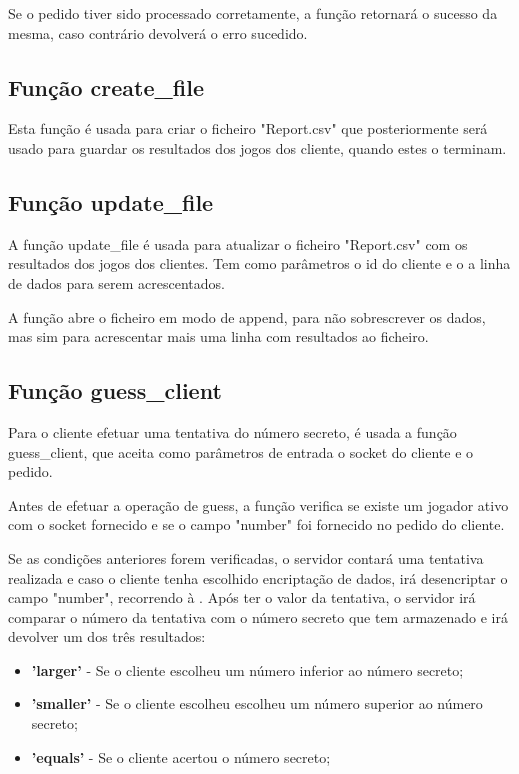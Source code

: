 \documentclass{report}
\begin{document}
Se o pedido tiver sido processado corretamente, a função retornará o sucesso da mesma, caso contrário devolverá o erro sucedido.

\subsection{Função create\_file}
\label{ssec:func_create_file}

Esta função é usada para criar o ficheiro "Report.csv" que posteriormente será usado para guardar os resultados dos jogos dos cliente, quando estes o terminam.

\subsection{Função update\_file}
\label{ssec:func_update_file}

A função update\_file é usada para atualizar o ficheiro "Report.csv" com os resultados dos jogos dos clientes. Tem como parâmetros o id do cliente e o a linha de dados para serem acrescentados.

A função abre o ficheiro em modo de append, para não sobrescrever os dados, mas sim para acrescentar mais uma linha com resultados ao ficheiro.

\subsection{Função guess\_client}
\label{ssec:func_guess_client}

Para o cliente efetuar uma tentativa do número secreto, é usada a função guess\_client, que aceita como parâmetros de entrada o socket do cliente e o pedido.

Antes de efetuar a operação de guess, a função verifica se existe um jogador ativo com o socket fornecido e se o campo "number" foi fornecido no pedido do cliente.

Se as condições anteriores forem verificadas, o servidor contará uma tentativa realizada e caso o cliente tenha escolhido encriptação de dados, irá desencriptar o campo "number", recorrendo à . Após ter o valor da tentativa, o servidor irá comparar o número da tentativa com o número secreto que tem armazenado e irá devolver um dos três resultados:
\begin{itemize}
\item \textbf{'larger'} - Se o cliente escolheu um número inferior ao número secreto;
\item \textbf{'smaller'} - Se o cliente escolheu escolheu um número superior ao número secreto;
\item \textbf{'equals'} - Se o cliente acertou o número secreto;
\end{itemize}
\end{document}
